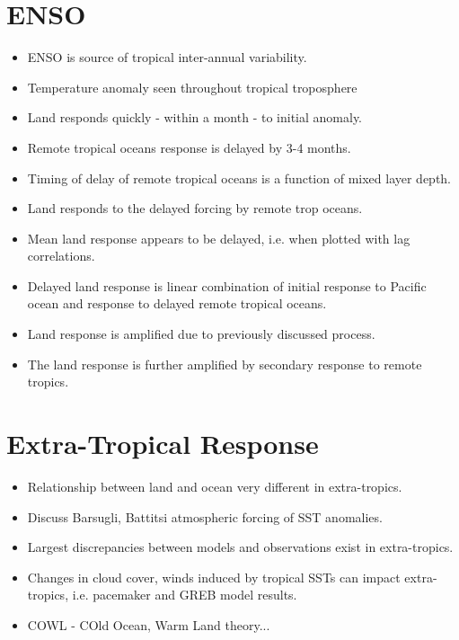 \section{ENSO}
\begin{itemize}
	\item ENSO is source of tropical inter-annual variability.
	\item Temperature anomaly seen throughout tropical troposphere
	\item Land responds quickly - within a month - to initial anomaly.
	\item Remote tropical oceans response is delayed by 3-4 months.
	\item Timing of delay of remote tropical oceans is a function of mixed layer 
		depth.
	\item Land responds to the delayed forcing by remote trop oceans.
	\item Mean land response appears to be delayed, i.e. when plotted with lag 
		correlations.
	\item Delayed land response is linear combination of initial response to 
		Pacific ocean and response to delayed remote tropical oceans.
	\item Land response is amplified due to previously discussed process.
	\item The land response is further amplified by secondary response to remote 
		tropics.
\end{itemize}



\section{Extra-Tropical Response}
\begin{itemize}
	\item Relationship between land and ocean very different in extra-tropics.
	\item Discuss Barsugli, Battitsi atmospheric forcing of SST anomalies.
	\item Largest discrepancies between models and observations exist in 
		extra-tropics.
	\item Changes in cloud cover, winds induced by tropical SSTs can impact 
		extra-tropics, i.e. pacemaker and GREB model results.
	\item COWL - COld Ocean, Warm Land theory...
\end{itemize}

